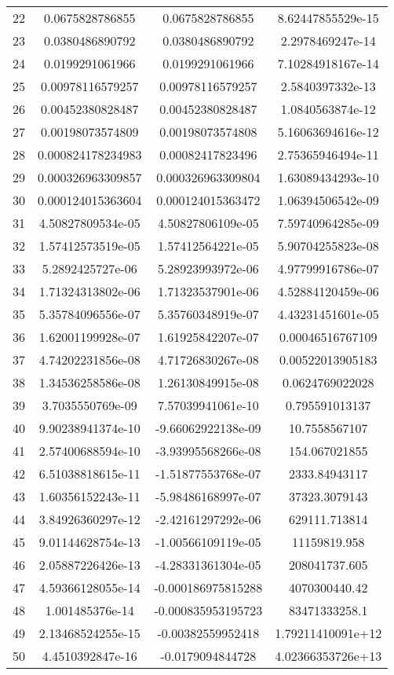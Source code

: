 \documentclass[10pt]{article}
\begin{document}
\begin{table}[H]
\begin{tabular}{c c c c}
22 & 0.0675828786855 & 0.0675828786855 & 8.62447855529e-15 \\
23 & 0.0380486890792 & 0.0380486890792 & 2.2978469247e-14 \\
24 & 0.0199291061966 & 0.0199291061966 & 7.10284918167e-14 \\
25 & 0.00978116579257 & 0.00978116579257 & 2.5840397332e-13 \\
26 & 0.00452380828487 & 0.00452380828487 & 1.0840563874e-12 \\
27 & 0.00198073574809 & 0.00198073574808 & 5.16063694616e-12 \\
28 & 0.000824178234983 & 0.00082417823496 & 2.75365946494e-11 \\
29 & 0.000326963309857 & 0.000326963309804 & 1.63089434293e-10 \\
30 & 0.000124015363604 & 0.000124015363472 & 1.06394506542e-09 \\
31 & 4.50827809534e-05 & 4.50827806109e-05 & 7.59740964285e-09 \\
32 & 1.57412573519e-05 & 1.57412564221e-05 & 5.90704255823e-08 \\
33 & 5.2892425727e-06 & 5.28923993972e-06 & 4.97799916786e-07 \\
34 & 1.71324313802e-06 & 1.71323537901e-06 & 4.52884120459e-06 \\
35 & 5.35784096556e-07 & 5.35760348919e-07 & 4.43231451601e-05 \\
36 & 1.62001199928e-07 & 1.61925842207e-07 & 0.00046516767109 \\
37 & 4.74202231856e-08 & 4.71726830267e-08 & 0.00522013905183 \\
38 & 1.34536258586e-08 & 1.26130849915e-08 & 0.0624769022028 \\
39 & 3.7035550769e-09 & 7.57039941061e-10 & 0.795591013137 \\
40 & 9.90238941374e-10 & -9.66062922138e-09 & 10.7558567107 \\
41 & 2.57400688594e-10 & -3.93995568266e-08 & 154.067021855 \\
42 & 6.51038818615e-11 & -1.51877553768e-07 & 2333.84943117 \\
43 & 1.60356152243e-11 & -5.98486168997e-07 & 37323.3079143 \\
44 & 3.84926360297e-12 & -2.42161297292e-06 & 629111.713814 \\
45 & 9.01144628754e-13 & -1.00566109119e-05 & 11159819.958 \\
46 & 2.05887226426e-13 & -4.28331361304e-05 & 208041737.605 \\
47 & 4.59366128055e-14 & -0.000186975815288 & 4070300440.42 \\
48 & 1.001485376e-14 & -0.000835953195723 & 83471333258.1 \\
49 & 2.13468524255e-15 & -0.00382559952418 & 1.79211410091e+12 \\
50 & 4.4510392847e-16 & -0.0179094844728 & 4.02366353726e+13 \\
\hline %
\end{tabular} 
\end{table} 
\end{document}
